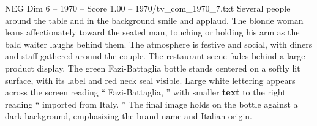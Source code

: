 \begin{textsample}{NEG Dim 6 – 1970 – Score 1.00 – 1970/tv\_com\_1970\_7.txt}
Several people around the table and in the background smile and applaud.
The blonde woman leans affectionately toward the seated man, touching or holding his arm as the bald waiter laughs behind them.
The atmosphere is festive and social, with diners and staff gathered around the couple.
The restaurant scene fades behind a large product display.
The green Fazi-Battaglia bottle stands centered on a softly lit surface, with its label and red neck seal visible.
Large white lettering appears across the screen reading “ Fazi-Battaglia, ” with smaller \textbf{text} to the right reading “ imported from Italy. ” The final image holds on the bottle against a dark background, emphasizing the brand name and Italian origin.

\end{textsample}
